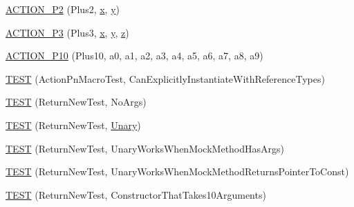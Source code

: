 \begin{DoxyCompactItemize}
\item 
\mbox{\hyperlink{namespacetesting_1_1gmock__generated__actions__test_a0e2768c0fae30bc46ec6e322b29dd54c}{A\+C\+T\+I\+O\+N\+\_\+\+P2}} (Plus2, \mbox{\hyperlink{_obj__test_2lib_2googletest-master_2googlemock_2test_2gmock-matchers__test_8cc_a6150e0515f7202e2fb518f7206ed97dc}{x}}, \mbox{\hyperlink{_obj__test_2lib_2googletest-master_2googlemock_2test_2gmock-matchers__test_8cc_a39cb44155237f0205e0feb931d5acbed}{y}})
\item 
\mbox{\hyperlink{namespacetesting_1_1gmock__generated__actions__test_afc911947c840aa9857eb2d06e4d80787}{A\+C\+T\+I\+O\+N\+\_\+\+P3}} (Plus3, \mbox{\hyperlink{_obj__test_2lib_2googletest-master_2googlemock_2test_2gmock-matchers__test_8cc_a6150e0515f7202e2fb518f7206ed97dc}{x}}, \mbox{\hyperlink{_obj__test_2lib_2googletest-master_2googlemock_2test_2gmock-matchers__test_8cc_a39cb44155237f0205e0feb931d5acbed}{y}}, \mbox{\hyperlink{_obj__test_2lib_2googletest-master_2googlemock_2test_2gmock-matchers__test_8cc_a196ff6a287f53f758b1506f21269fc77}{z}})
\item 
\mbox{\hyperlink{namespacetesting_1_1gmock__generated__actions__test_a4e48e01a7bfc369d279cc0c99a7d3c60}{A\+C\+T\+I\+O\+N\+\_\+\+P10}} (Plus10, a0, a1, a2, a3, a4, a5, a6, a7, a8, a9)
\item 
\mbox{\hyperlink{namespacetesting_1_1gmock__generated__actions__test_a20664d32f08c53d6f9fa5e020a85fab3}{T\+E\+ST}} (Action\+Pn\+Macro\+Test, Can\+Explicitly\+Instantiate\+With\+Reference\+Types)
\item 
\mbox{\hyperlink{namespacetesting_1_1gmock__generated__actions__test_a058a3d17071ddb888319ab71b491af94}{T\+E\+ST}} (Return\+New\+Test, No\+Args)
\item 
\mbox{\hyperlink{namespacetesting_1_1gmock__generated__actions__test_a64f3f8327d51c139b441846e809ae4bc}{T\+E\+ST}} (Return\+New\+Test, \mbox{\hyperlink{namespacetesting_1_1gmock__generated__actions__test_a61f0e6c3f2c07079299f1d6e1667ab92}{Unary}})
\item 
\mbox{\hyperlink{namespacetesting_1_1gmock__generated__actions__test_ad8f696b14b0f2dba4986c53f615aef15}{T\+E\+ST}} (Return\+New\+Test, Unary\+Works\+When\+Mock\+Method\+Has\+Args)
\item 
\mbox{\hyperlink{namespacetesting_1_1gmock__generated__actions__test_ad9f45ddc4a5616b919116c766ad37a30}{T\+E\+ST}} (Return\+New\+Test, Unary\+Works\+When\+Mock\+Method\+Returns\+Pointer\+To\+Const)
\item 
\mbox{\hyperlink{namespacetesting_1_1gmock__generated__actions__test_a1ed6392f4aeb68b9429ff7dd98ce5a86}{T\+E\+ST}} (Return\+New\+Test, Constructor\+That\+Takes10\+Arguments)

\end{DoxyCompactItemize}
